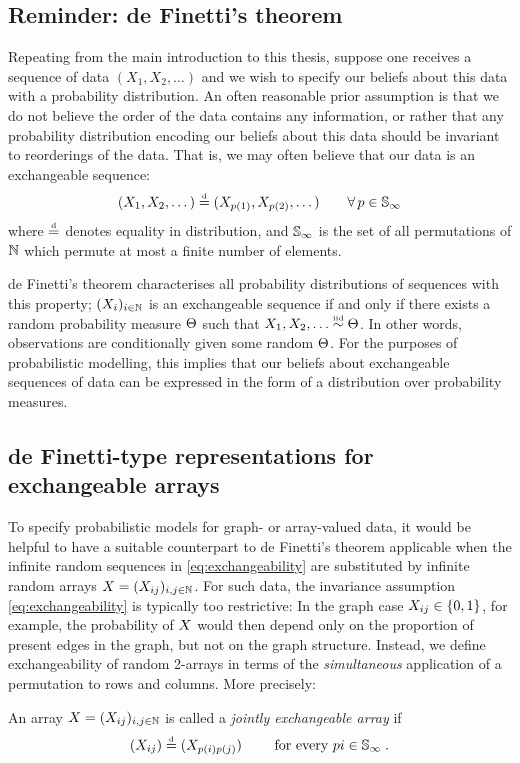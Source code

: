 \subsection{Reminder: de Finetti's theorem}

Repeating from the main introduction to this thesis, suppose one receives a sequence of data $(X_1, X_2, \dots)$ and we wish to specify our beliefs about this data with a probability distribution.
An often reasonable prior assumption is that we do not believe the order of the data contains any information, or rather that any probability distribution encoding our beliefs about this data should be invariant to reorderings of the data.
That is, we may often believe that our data is an exchangeable sequence:
\[
  \label{eq:networks:exch}
  (X_1, X_2, \dots) \stackrel{\mbox{\tiny d}}{=} (X_{p(1)}, X_{p(2)}, \dots) \qquad \forall\, p\in\mathbb{S}_{\infty}
\]
where $\stackrel{\mbox{\tiny d}}{=}$ denotes equality in distribution, and $\mathbb{S}_{\infty}$ is the set of all permutations of $\mathbb{N}$ which permute at most a finite number of elements.

de Finetti's theorem \citep[e.g.][]{Kallenberg:2005} characterises all probability distributions of sequences with this property;  $(X_i)_{i\in\mathbb{N}}$ is an exchangeable sequence if and only if there exists a random probability measure $\Theta$ such that $X_1,X_2,\ldots\overset{\mbox{\tiny iid}}{\sim}\Theta$.
In other words, observations are conditionally \iid given some random $\Theta$.
For the purposes of probabilistic modelling, this implies that our beliefs about exchangeable sequences of data can be expressed in the form of a distribution over probability measures.

\subsection{de Finetti-type representations for exchangeable arrays}

To specify probabilistic models for graph- or array-valued data, it would be helpful to have a suitable counterpart to de Finetti's theorem applicable when the infinite random sequences in \eqref{eq:exchangeability} are substituted by infinite random arrays $X=(X_{ij})_{i,j\in\mathbb{N}}$.
For such data, the invariance assumption \eqref{eq:exchangeability} is typically too restrictive: In the graph case $X_{ij}\in\lbrace 0,1\rbrace$, for example, the probability of $X$ would then depend only on the proportion of present edges in the graph, but not on the graph structure.
Instead, we define exchangeability of random 2-arrays in terms of the \emph{simultaneous} application of a permutation to rows and columns.
More precisely:
\begin{definition}
  An array $X=(X_{ij})_{i,j\in\mathbb{N}}$ is called a \emph{jointly exchangeable array} if 
  \begin{equation}
    \label{eq:jointly:ex}
    (X_{ij})\stackrel{\mbox{\tiny d}}{=}(X_{p(i)p(j)}) \qquad\text{ for every }pi\in\mathbb{S}_{\infty}\;.
  \end{equation}
\end{definition}

